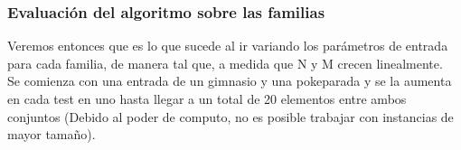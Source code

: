 \begin{figure} [!ht]
    \label{fig:f5}
    \label{fig:f6}
    \label{fig:f7}
    \label{fig:f8}
\end{figure}


\newpage
 
 
  \subsubsection*{Evaluación del algoritmo sobre las familias}

\indent Veremos entonces que es lo que sucede al ir variando los parámetros de entrada para cada familia, de manera tal que, a medida que N y M crecen linealmente.\\

Se comienza con una entrada de un gimnasio y una pokeparada y se la aumenta en cada test en uno hasta llegar a un total de 20 elementos entre ambos conjuntos (Debido al poder de computo, no es posible trabajar con instancias de mayor tamaño).\\

